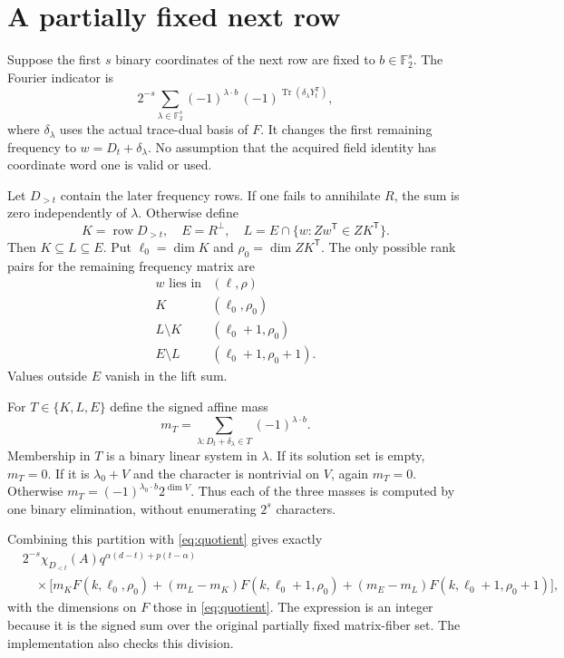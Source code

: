 \documentclass[11pt]{article}
\newcommand{\F}{\mathbb F}
\newcommand{\row}{\operatorname{row}}
\begin{document}
\section{A partially fixed next row}

Suppose the first $s$ binary coordinates of the next row are fixed to
$b\in\F_2^s$. The Fourier indicator is
\[
 2^{-s}\sum_{\lambda\in\F_2^s}
       (-1)^{\lambda\cdot b}\,
       (-1)^{\operatorname{Tr}(\delta_\lambda Y_t^{\mathsf T})},
\]
where $\delta_\lambda$ uses the actual trace-dual basis of $F$. It changes
the first remaining frequency to $w=D_t+\delta_\lambda$. No assumption that
the acquired field identity has coordinate word one is valid or used.

Let $D_{>t}$ contain the later frequency rows. If one fails to annihilate
$R$, the sum is zero independently of $\lambda$. Otherwise define
\[
 K=\row D_{>t},\quad E=R^\perp,\quad
 L=E\cap\{w:Zw^{\mathsf T}\in ZK^{\mathsf T}\}.
\]
Then $K\subseteq L\subseteq E$. Put
$\ell_0=\dim K$ and $\rho_0=\dim ZK^{\mathsf T}$.
The only possible rank pairs for the remaining frequency matrix are
\[
\begin{array}{c|c}
 w\text{ lies in}&(\ell,\rho)\\\hline
 K&(\ell_0,\rho_0)\\
 L\setminus K&(\ell_0+1,\rho_0)\\
 E\setminus L&(\ell_0+1,\rho_0+1).
\end{array}
\]
Values outside $E$ vanish in the lift sum.

For $T\in\{K,L,E\}$ define the signed affine mass
\[
 m_T=\sum_{\lambda:D_t+\delta_\lambda\in T}(-1)^{\lambda\cdot b}.
\]
Membership in $T$ is a binary linear system in $\lambda$. If its solution
set is empty, $m_T=0$. If it is $\lambda_0+V$ and the character is
nontrivial on $V$, again $m_T=0$. Otherwise
$m_T=(-1)^{\lambda_0\cdot b}2^{\dim V}$. Thus each of the three masses
is computed by one binary elimination, without enumerating $2^s$ characters.

Combining this partition with \eqref{eq:quotient} gives exactly
\begin{align*}
 &2^{-s}\chi_{D_{<t}}(A)
       q^{\alpha(d-t)+p(t-\alpha)}\\
 &\quad\times\bigl[
 m_KF(k,\ell_0,\rho_0)
 +(m_L-m_K)F(k,\ell_0+1,\rho_0)
 +(m_E-m_L)F(k,\ell_0+1,\rho_0+1)\bigr],
\end{align*}
with the dimensions on $F$ those in \eqref{eq:quotient}. The expression
is an integer because it is the signed sum over the original partially
fixed matrix-fiber set. The implementation also checks this division.
\end{document}
